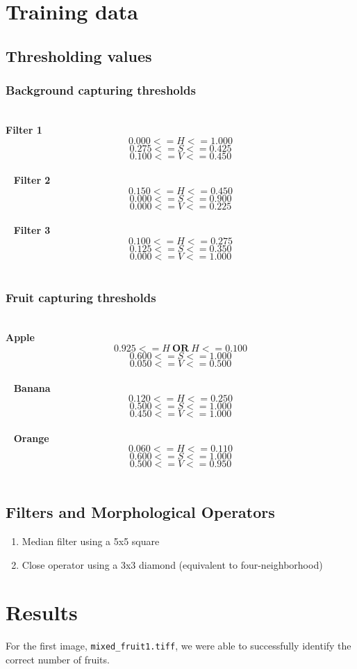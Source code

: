 \documentclass{article}
\begin{document}
\section{Training data}
\subsection{Thresholding values}
\label{subsec:process:filters}
\subsubsection{Background capturing thresholds}
\label{subsubsec:process:filters:background}
~\\
\textbf{Filter 1}
\[0.000 <= H <= 1.000\]
\[0.275 <= S <= 0.425\]
\[0.100 <= V <= 0.450\]\\
~
\textbf{Filter 2}
\[0.150 <= H <= 0.450\]
\[0.000 <= S <= 0.900\]
\[0.000 <= V <= 0.225\]\\
~
\textbf{Filter 3}
\[0.100 <= H <= 0.275\]
\[0.125 <= S <= 0.350\]
\[0.000 <= V <= 1.000\]\\

\subsubsection{Fruit capturing thresholds}
\label{subsubsec:process:filters:fruit}
~\\
\textbf{Apple}
\[0.925 <= H\ \textbf{OR}\ H <= 0.100\]
\[0.600 <= S <= 1.000\]
\[0.050 <= V <= 0.500\]\\
~
\textbf{Banana}
\[0.120 <= H <= 0.250\]
\[0.500 <= S <= 1.000\]
\[0.450 <= V <= 1.000\]\\
~
\textbf{Orange}
\[0.060 <= H <= 0.110\]
\[0.600 <= S <= 1.000\]
\[0.500 <= V <= 0.950\]\\

\subsection{Filters and Morphological Operators}
\label{subsec:process:filtmorph}
\begin{enumerate}
\item Median filter using a 5x5 square
\item Close operator using a 3x3 diamond (equivalent to four-neighborhood)
\end{enumerate}

\section{Results}
For the first image, \texttt{mixed\_fruit1.tiff}, we were able to successfully identify the correct number of fruits. 
\end{document}
